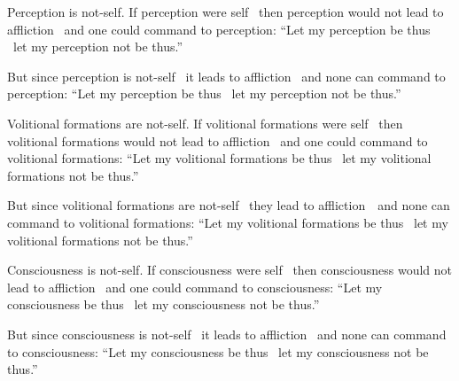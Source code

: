 \begin{english-only-hang}
  Perception is not-self. If perception were self \breathmark\ then perception would not lead to affliction \breathmark\ and one could command to perception: ``Let my perception be thus \breathmark\ let my perception not be thus.''
\end{english-only-hang}

\begin{english-only-hangtogether}
  But since perception is not-self \breathmark\ it leads to affliction \breathmark\ and none can command to perception: ``Let my perception be thus \breathmark\ let my perception not be thus.''
\end{english-only-hangtogether}

\begin{english-only-hang}
  Volitional formations are not-self. If volitional formations were self \breathmark\ then volitional formations would not lead to affliction \breathmark\ and one could command to volitional formations: ``Let my volitional formations be thus \breathmark\ let my volitional formations not be thus.''
\end{english-only-hang}

\begin{english-only-hangtogether}
  But since volitional formations are not-self \breathmark\ they lead to \mbox{affliction}~\breathmark\ and none can command to volitional formations: ``Let my volitional formations be thus \breathmark\ let my volitional formations not be thus.''
\end{english-only-hangtogether}

\begin{english-only-hang}
  Consciousness is not-self. If consciousness were self \breathmark\ then consciousness would not lead to affliction \breathmark\ and one could command to consciousness: ``Let my consciousness be thus \breathmark\ let my consciousness not be thus.''
\end{english-only-hang}

\begin{english-only-hangtogether}
  But since consciousness is not-self \breathmark\ it leads to affliction \breathmark\ and none can command to consciousness: ``Let my consciousness be thus \breathmark\ let my consciousness not be thus.''
\end{english-only-hangtogether}

